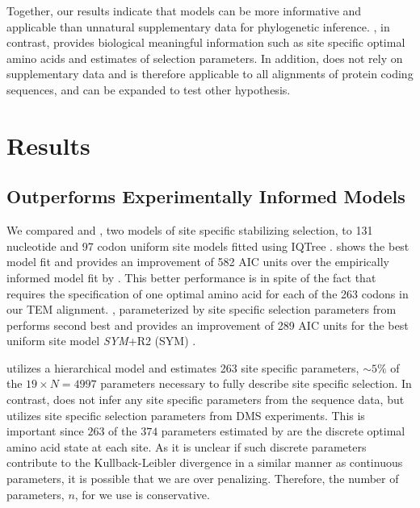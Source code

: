 \documentclass[12pt]{article}
\begin{document}
Together, our results indicate that models can be more informative and applicable than unnatural supplementary data for phylogenetic inference.
\selac, in contrast, provides biological meaningful information such as site specific optimal amino acids and estimates of selection parameters.
In addition, \selac does not rely on supplementary data and is therefore applicable to all alignments of protein coding sequences, and can be expanded to test other hypothesis.

\section{Results}
\subsection{\selac Outperforms Experimentally Informed Models}

We compared \selac and \phydms, two models of site specific stabilizing selection, to 131 nucleotide and 97 codon uniform site models fitted using IQTree \citep[][see Table \ref{tab:AIC_selac} for the best performing models and Table \ref{tab:AIC_full} for all models]{nguyen2015}.
\selac shows the best model fit and provides an improvement of 582 AIC units over the empirically informed model fit by \phydms.
This better performance is in spite of the fact that \selac requires the specification of one optimal amino acid for each of the 263 codons in our TEM alignment.
\phydms, parameterized by site specific selection parameters from \citet{stiffler2016} performs second best and provides an improvement of 289 AIC units for the best uniform site model \emph{SYM}+R2 (SYM) \citet{zharkikh1994}. 

\selac utilizes a hierarchical model and estimates 263 site specific parameters, $\sim5\%$ of the $19\times N = 4997$ parameters necessary to fully describe site specific selection.
In contrast, \phydms does not infer any site specific parameters from the sequence data, but utilizes site specific selection parameters from DMS experiments.
This is important since $263$ of the $374$ parameters estimated by \selac are the discrete optimal amino acid state at each site. 
As it is unclear if such discrete parameters contribute to the Kullback-Leibler divergence in a similar manner as continuous parameters, it is possible that we are over penalizing.
Therefore, the number of parameters, $n$, for \selac we use is conservative.
\end{document}
